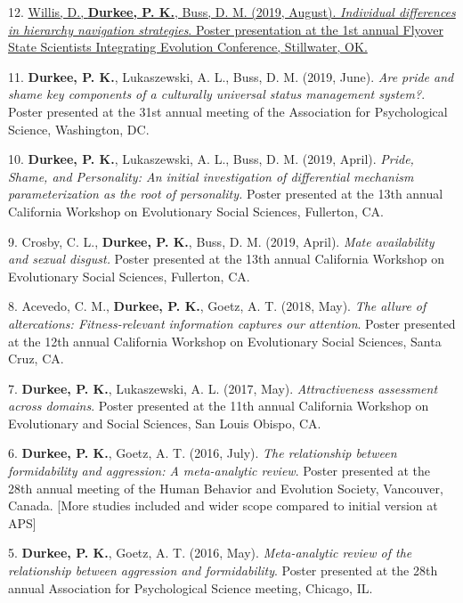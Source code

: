 \documentclass[10pt,]{article}
\begin{document}
12. \hangindent=0.5in \href{https://osf.io/3rv7z/}{Willis,
D.\textsuperscript{\faChevronCircleDown}, \textbf{Durkee, P. K.}, Buss,
D. M. (2019, August). \emph{Individual differences in hierarchy
navigation strategies}. Poster presentation at the 1st annual Flyover
State Scientists Integrating Evolution Conference, Stillwater,
OK.\textsuperscript{\faFilePdfO}}

11. \hangindent=0.5in \textbf{Durkee, P. K.}, Lukaszewski, A. L., Buss,
D. M. (2019, June). \emph{Are pride and shame key components of a
culturally universal status management system?}. Poster presented at the
31st annual meeting of the Association for Psychological Science,
Washington, DC.

10. \hangindent=0.5in \textbf{Durkee, P. K.}, Lukaszewski, A. L., Buss,
D. M. (2019, April). \emph{Pride, Shame, and Personality: An initial
investigation of differential mechanism parameterization as the root of
personality.} Poster presented at the 13th annual California Workshop on
Evolutionary Social Sciences, Fullerton, CA.

9. \hangindent=0.5in Crosby, C. L., \textbf{Durkee, P. K.}, Buss, D. M.
(2019, April). \emph{Mate availability and sexual disgust.} Poster
presented at the 13th annual California Workshop on Evolutionary Social
Sciences, Fullerton, CA.

8. \hangindent=0.5in Acevedo, C.
M.\textsuperscript{\faChevronCircleDown}, \textbf{Durkee, P. K.}, Goetz,
A. T. (2018, May). \emph{The allure of altercations: Fitness-relevant
information captures our attention}. Poster presented at the 12th annual
California Workshop on Evolutionary Social Sciences, Santa Cruz, CA.

7. \hangindent=0.5in \textbf{Durkee, P. K.}, Lukaszewski, A. L. (2017,
May). \emph{Attractiveness assessment across domains}. Poster presented
at the 11th annual California Workshop on Evolutionary and Social
Sciences, San Louis Obispo, CA.

6. \hangindent=0.5in \textbf{Durkee, P. K.}, Goetz, A. T. (2016, July).
\emph{The relationship between formidability and aggression: A
meta-analytic review}. Poster presented at the 28th annual meeting of
the Human Behavior and Evolution Society, Vancouver, Canada. {[}More
studies included and wider scope compared to initial version at APS{]}

5. \hangindent=0.5in \textbf{Durkee, P. K.}, Goetz, A. T. (2016, May).
\emph{Meta-analytic review of the relationship between aggression and
formidability}. Poster presented at the 28th annual Association for
Psychological Science meeting, Chicago, IL.
\end{document}
